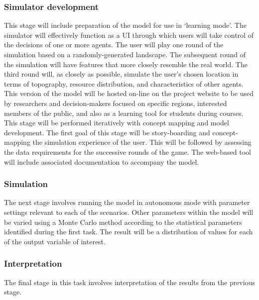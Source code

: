 \documentclass[11pt,a4paper]{article}
\begin{document}
\subsubsection{Simulator development}


This stage will include preparation of the model 
for use in `learning mode'.
The simulator will effectively function as a 
UI through which users will 
take control of the decisions of one or more agents.
The user will play one round of the simulation based 
on a randomly-generated landscape.
The subsequent round of the simulation 
will have features that more closely resemble the real world.
The third round will, as closely as possible, 
simulate the user's chosen location in terms of 
topography, 
resource distribution, and
characteristics of other agents.
This version of the model will be hosted on-line on the project website 
to be used by researchers and decision-makers focused on specific regions,
interested members of the public, 
and also as a learning tool for students during courses.
This stage will be performed iteratively with concept mapping and model development.
The first goal of this stage will be 
story-boarding and 
concept-mapping 
the simulation experience of the user.
This will be followed by assessing the 
data requirements for the successive rounds of the game.
The web-based tool will include associated documentation to accompany the model.

\subsubsection{Simulation}

The next stage involves running the model in autonomous mode
with parameter settings relevant to each of the scenarios. 
Other parameters within the model will be varied 
using a Monte Carlo method according to 
the statistical parameters identified during the first task. 
The result will be a distribution of values for each of 
the output variable of interest.

\subsubsection{Interpretation}

The final stage in this task involves 
interpretation of the results from the previous stage. 
\end{document}
